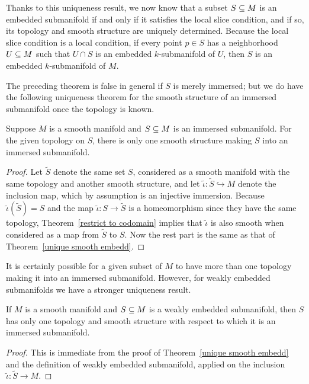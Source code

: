 Thanks to this uniqueness result, we now know that a subset $S\subseteq M$ is an embedded submanifold if and only if it satisfies the local slice condition, and if so, its
topology and smooth structure are uniquely determined. Because the local slice condition is a local condition, if every point $p\in S$ has a neighborhood $U\subseteq M$ such that $U\cap S$ is an embedded $k$-submanifold of $U$, then $S$ is an embedded $k$-submanifold of $M$.\par
The preceding theorem is false in general if $S$ is merely immersed; but we do have the following uniqueness theorem for the smooth structure of an immersed submanifold once the topology is known.
\begin{theorem}\label{unique struct immersed}
Suppose $M$ is a smooth manifold and $S\subseteq M$ is an immersed submanifold. For the given topology on $S$, there is only one smooth structure making $S$ into an immersed submanifold.
\end{theorem}
\begin{proof}
Let $\widetilde{S}$ denote the same set $S$, considered as a smooth manifold with the same topology and another smooth structure, and let $\tilde{\iota}:\widetilde{S}\hookrightarrow M$ denote the inclusion map, which by assumption is an injective immersion. Because $\tilde{\iota}(\widetilde{S})=S$ and the map $\tilde{\iota}:S\to\widetilde{S}$ is a homeomorphism since they have the same topology, Theorem~\ref{restrict to codomain} implies that $\tilde{\iota}$ is also smooth when considered as a map from $\widetilde{S}$ to $S$. Now the rest part is the same as that of Theorem~\ref{unique smooth embedd}.
\end{proof}
It is certainly possible for a given subset of $M$ to have more than one topology making it into an immersed submanifold. However, for weakly embedded submanifolds we have a stronger uniqueness result.
\begin{theorem}\label{unique smooth weak embedd}
If $M$ is a smooth manifold and $S\subseteq M$ is a weakly embedded submanifold, then $S$ has only one topology and smooth structure with respect to which it is an immersed submanifold.
\end{theorem}
\begin{proof}
This is immediate from the proof of Theorem~\ref{unique smooth embedd} and the definition of weakly embedded submanifold, applied on the inclusion $\tilde{\iota}:\widetilde{S}\to M$.
\end{proof}
